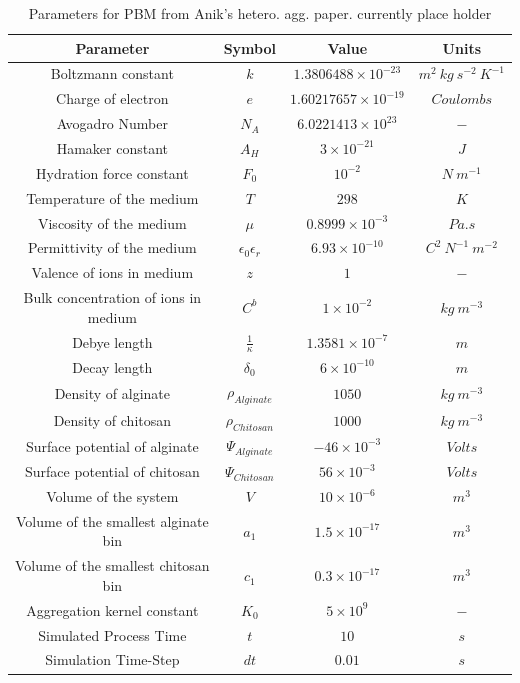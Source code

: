 \documentclass[preprint,11pt,authoryear]{elsarticle}
\begin{document}
\begin{table}[!htb]
\caption{Parameters for PBM from Anik's hetero. agg. paper. currently place holder} \label{table:mthds_pbm_parameters}
\begin{center}
\begin{tabular}{c|c|c|c}
\hline
\bf{Parameter} &\bf{Symbol} &\bf{Value} &\bf{Units}\\
\hline
Boltzmann constant & $k$ & $1.3806488 \times 10^{-23}$ & $m^2~kg~s^{-2}~K^{-1}$\\
Charge of electron & $e$ & $1.60217657 \times 10^{-19}$ & $Coulombs$\\
Avogadro Number & $N_A$ & $6.0221413 \times 10^{23}$ & $-$\\
Hamaker constant & $A_H$ & $3 \times 10^{-21}$ & $J$\\
Hydration force constant & $F_0$ & $10^{-2}$ & $N~m^{-1}$\\
Temperature of the medium & $T$ & $298$ & $K$\\
Viscosity of the medium & $\mu$ & $0.8999 \times 10^{-3}$ & $Pa.s$\\
Permittivity of the medium & $\epsilon_0 \epsilon_r$ & $6.93\times 10^{-10}$ & $C^2~N^{-1}~m^{-2}$ \\
Valence of ions in medium & $z$ & $1$ & $-$\\
Bulk concentration of ions in medium & $C^b$ & $1 \times 10^{-2}$ & $kg~m^{-3}$\\
Debye length & $\frac{1}{\kappa} $ & $1.3581 \times 10^{-7}$ & $m$\\
Decay length & $\delta_0$ & $6 \times 10^{-10}$ & $m$\\
Density of alginate & $\rho_{Alginate}$ & $1050$ & $kg~m^{-3}$ \\
Density of chitosan & $\rho_{Chitosan}$ & $1000$ & $kg~m^{-3}$ \\
Surface potential of alginate & $\Psi_{Alginate}$ & $-46 \times 10^{-3}$ & $Volts$\\
Surface potential of chitosan & $\Psi_{Chitosan}$ & $56 \times 10^{-3}$ & $Volts$\\
Volume of the system & $V$ & $10\times10^{-6}$ & $m^3$\\
Volume of the smallest alginate bin & $a_1$ & $1.5 \times 10^{-17}$ & $m^{3}$\\
Volume of the smallest chitosan bin & $c_1$ & $0.3 \times 10^{-17}$ & $m^{3}$ \\
Aggregation kernel constant & $K_0$ & $5 \times 10^{9}$ & $-$\\
Simulated Process Time & $t$ & $10$ & $s$\\
Simulation Time-Step & $dt$ & $0.01$ & $s$\\
\hline
\end{tabular}
\end{center}
\end{table}
\end{document}
